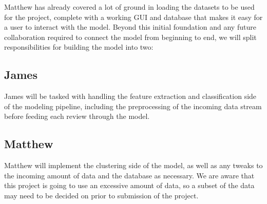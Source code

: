 Matthew has already covered a lot of ground in loading the datasets to be used for the project,
complete with a working GUI and database that makes it easy for a user to interact with the model.
Beyond this initial foundation and any future collaboration required to connect the model from 
beginning to end, we will split responsibilities for building the model into two:

\subsection{James}
	James will be tasked with handling the feature extraction and classification side of
	the modeling pipeline, including the preprocessing of the incoming data stream before feeding
	each review through the model.
	
\subsection{Matthew}
	Matthew will implement the clustering side of the model, as well as any tweaks to the incoming
	amount of data and the database as necessary. We are aware that this project is going to use an
	excessive amount of data, so a subset of the data may need to be decided on prior to 
	submission of the project.